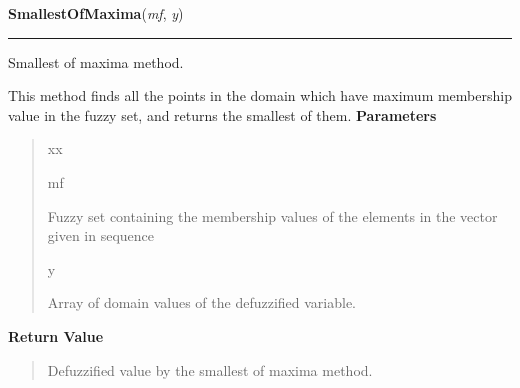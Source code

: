 \hspace{.8\funcindent}\begin{boxedminipage}{\funcwidth}

    \raggedright \textbf{SmallestOfMaxima}(\textit{mf}, \textit{y})

    \vspace{-1.5ex}

    \rule{\textwidth}{0.5\fboxrule}
\setlength{\parskip}{2ex}

Smallest of maxima method.

This method finds all the points in the domain which have maximum membership
value in the fuzzy set, and returns the smallest of them.
\setlength{\parskip}{1ex}
      \textbf{Parameters}
      \vspace{-1ex}

      \begin{quote}
        \begin{Ventry}{xx}

          \item[mf]


Fuzzy set containing the membership values of the elements in the
vector given in sequence
          \item[y]


Array of domain values of the defuzzified variable.
        \end{Ventry}

      \end{quote}

      \textbf{Return Value}
    \vspace{-1ex}

      \begin{quote}

Defuzzified value by the smallest of maxima method.
      \end{quote}

    \end{boxedminipage}

    \label{peach:fuzzy:defuzzy:LargestOfMaxima}

    \vspace{0.5ex}

